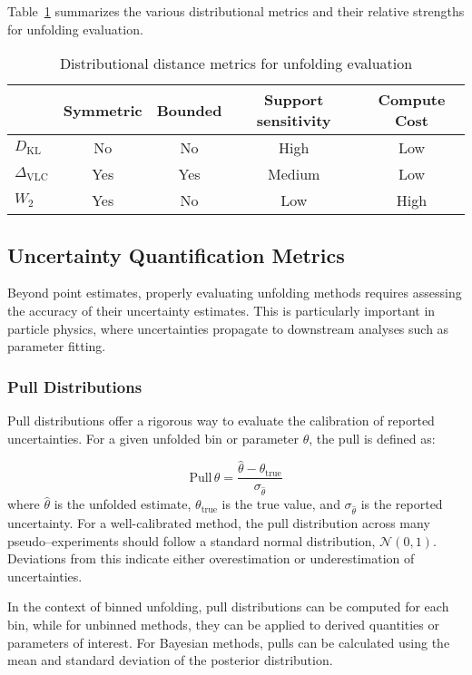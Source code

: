 Table~\ref{tab:dist_metrics} summarizes the various distributional metrics and their relative strengths for unfolding evaluation.
\begin{table}
\centering
\caption{Distributional distance metrics for unfolding evaluation}
\label{tab:dist_metrics}
\begin{tabular}{lcccc}
\hline
 & Symmetric & Bounded & Support sensitivity & Compute Cost \\
\hline
\(D_{\textrm{KL}}\) & No & No & High & Low \\
\(\Delta_{\textrm{VLC}}\) & Yes & Yes & Medium & Low \\
\(W_2\) & Yes & No & Low & High \\
\hline
\end{tabular}
\end{table}
\subsection{Uncertainty Quantification Metrics}
Beyond point estimates, properly evaluating unfolding methods requires assessing the accuracy of their uncertainty estimates. 
%
This is particularly important in particle physics, where uncertainties propagate to downstream analyses such as parameter fitting.
\subsubsection{Pull Distributions}
Pull distributions offer a rigorous way to evaluate the calibration of reported uncertainties.
%
For a given unfolded bin or parameter \(\theta\), the pull is defined as:

\begin{equation}
\text{Pull}\,{\theta} = \frac{\hat{\theta} - \theta_{\text{true}}}{\sigma_{\hat{\theta}}}
\end{equation}
where \(\hat{\theta}\) is the unfolded estimate, \(\theta_{\text{true}}\) is the true value, and \(\sigma_{\hat{\theta}}\) is the reported uncertainty.
%
For a well-calibrated method, the pull distribution across many pseudo--experiments should follow a standard normal distribution, \(\mathcal{N}(0,1)\).
%
Deviations from this indicate either overestimation or underestimation of uncertainties.

In the context of binned unfolding, pull distributions can be computed for each bin, while for unbinned methods, they can be applied to derived quantities or parameters of interest.
%
For Bayesian methods, pulls can be calculated using the mean and standard deviation of the posterior distribution.

